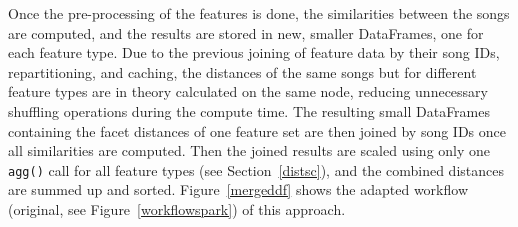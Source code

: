 \noindent Once the pre-processing of the features is done, the similarities between the songs are computed, and the results are stored in new, smaller DataFrames, one for each feature type. Due to the previous joining of feature data by their song IDs, repartitioning, and caching, the distances of the same songs but for different feature types are in theory calculated on the same node, reducing unnecessary shuffling operations during the compute time. The resulting small DataFrames containing the facet distances of one feature set are then joined by song IDs once all similarities are computed. Then the joined results are scaled using only one \lstinline{agg()} call for all feature types (see Section~\ref{distsc}), and the combined distances are summed up and sorted.
\noindent Figure~\ref{mergeddf} shows the adapted workflow (original, see Figure~\ref{workflowspark}) of this approach.\\

